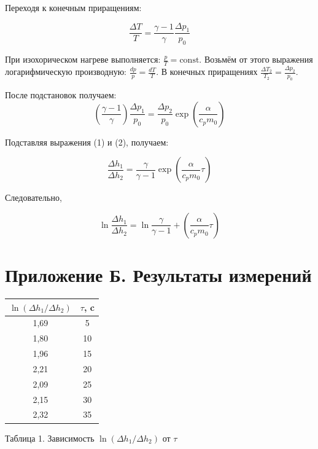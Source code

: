 Переходя к конечным приращениям:

\begin{equation}
    \frac{\Delta T}{T} = \frac{\gamma - 1}{\gamma} \frac{\Delta p_1}{p_0}
\end{equation}

При изохорическом нагреве выполняется: $\frac{p}{T} = \text{const}$. Возьмём от этого выражения логарифмическую производную: $\frac{dp}{p} = \frac{dT}{T}$. В конечных приращениях $\frac{\Delta T_2}{T_2} = \frac{\Delta p_2}{p_0}$.

После подстановок получаем:
\begin{equation}
    \left( \frac{\gamma - 1}{\gamma} \right) \frac{\Delta p_1}{p_0} = \frac{\Delta p_2}{p_0} \exp\left(\frac{\alpha}{c_p m_0}\right)
\end{equation}


Подставляя выражения (1) и (2), получаем:

\begin{equation}
    \frac{\Delta h_1}{\Delta h_2} = \frac{\gamma}{\gamma - 1} \exp \left( \frac{\alpha}{c_p m_0}  \tau\right) 
\end{equation}

Следовательно, 

\begin{equation}
    \ln{\frac{\Delta h_1}{\Delta h_2}} = \ln{\frac{\gamma}{\gamma - 1}} + \left( \frac{\alpha}{c_p m_0}  \tau\right) 
\end{equation}

\section{Приложение Б. Результаты измерений}

\begin{center}
    \begin{tabular}{|c|c|}
    \hline
    $\ln(\Delta h_1/\Delta h_2)$ & $\tau$, c \\ 
    \hline
    1,69 & 5 \\
    1,80 & 10 \\ 
    1,96 & 15 \\
    2,21 & 20 \\
    2,09 & 25 \\
    2,15 & 30 \\
    2,32 & 35 \\
    \hline
    \end{tabular}
\end{center}
\begin{center}
    Таблица 1. Зависимость $\ln(\Delta h_1/\Delta h_2)$ от $\tau$ 
\end{center}

